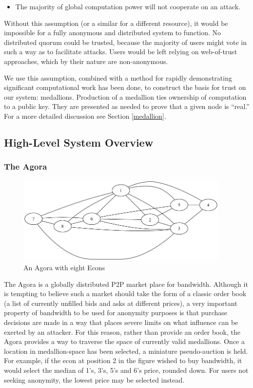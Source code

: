 \documentclass{article}
\begin{document}
\begin{itemize}
\item The majority of global computation power will not cooperate on an attack.
\end{itemize}

Without this assumption (or a similar for a different resource), it would be impossible for a fully anonymous and distributed system to function. No distributed quorum could be trusted, because the majority of users might vote in such a way as to facilitate attacks. Users would be left relying on web-of-trust approaches, which by their nature are non-anonymous.

We use this assumption, combined with a method for rapidly demonstrating significant computational work has been done, to construct the basis for trust on our system: medallions. Production of a medallion ties ownership of computation to a public key. They are presented as needed to prove that a given node is “real.” For a more detailed discussion see Section \ref{medallion}.

\subsection{High-Level System Overview}

\subsubsection{The Agora}

\begin{figure}[htbp]
  \centering
  \includegraphics[width = 300pt]{agoraOverview}
  \caption{An Agora with eight Econs}
\end{figure}

The Agora is a globally distributed P2P market place for bandwidth. Although it is tempting to believe such a market should take the form of a classic order book (a list of currently unfilled bids and asks at different prices), a very important property of bandwidth to be used for anonymity purposes is that purchase decisions are made in a way that places severe limits on what influence can be exerted by an attacker. For this reason, rather than provide an order book, the Agora provides a way to traverse the space of currently valid medallions. Once a location in medallion-space has been selected, a miniature pseudo-auction is held. For example, if the econ at position 2 in the figure wished to buy bandwidth, it would select the median of 1’s, 3’s, 5’s and 6’s price, rounded down. For users not seeking anonymity, the lowest price may be selected instead.
\end{document}
